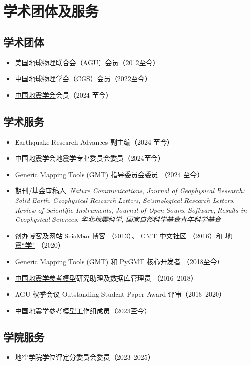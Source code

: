 \section{学术团体及服务}

\subsection{学术团体}
\begin{itemize}
\item \href{https://sites.agu.org/}{美国地球物理联合会（AGU）}会员（2012至今）
\item \href{http://www.cgscgs.org.cn/}{中国地球物理学会（CGS）}会员（2022至今）
\item \href{https://www.ssoc.org.cn/}{中国地震学会}会员（2024 至今）
\end{itemize}

\subsection{学术服务}
\begin{itemize}
\item Earthquake Research Advances 副主编（2024 至今）
\item 中国地震学会地震学专业委员会委员（2024至今）
\item Generic Mapping Tools (GMT) 指导委员会委员 （2024 至今）
\item 期刊/基金审稿人:
      \emph{Nature Communications},
      \emph{Journal of Geophysical Research: Solid Earth},
      \emph{Geophysical Research Letters},
      \emph{Seismological Research Letters},
      \emph{Review of Scientific Instruments},
      \emph{Journal of Open Source Software},
      \emph{Results in Geophysical Sciences},
      \emph{华北地震科学},
      \emph{国家自然科学基金青年科学基金}
\item 创办博客及网站
      \href{https://blog.seisman.info}{SeisMan 博客} （2013）、
      \href{http://gmt-china.org/}{GMT 中文社区} （2016）和
      \href{https://seismo-learn.org/}{地震``学''} （2020）
\item \href{https://github.com/GenericMappingTools/gmt}{Generic Mapping Tools (GMT)} 和
      \href{https://github.com/GenericMappingTools/pygmt}{PyGMT} 核心开发者 （2018至今）
\item \href{http://chinageorefmodel.org/}{中国地震学参考模型}研究助理及数据库管理员 （2016--2018）
\item AGU 秋季会议 Outstanding Student Paper Award 评审（2018--2020）
\item \href{http://chinageorefmodel.org/}{中国地震学参考模型}工作组成员（2023至今）
\end{itemize}

\subsection{学院服务}
\begin{itemize}
\item 地空学院学位评定分委员会委员（2023--2025）
\end{itemize}
